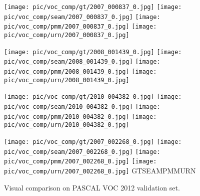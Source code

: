 \begin{figure}[h!]
\begin{centering}
\texttt{[image: pic/voc\_comp/gt/2007\_000837\_0.jpg]} \texttt{[image: pic/voc\_comp/seam/2007\_000837\_0.jpg]} \texttt{[image: pic/voc\_comp/pmm/2007\_000837\_0.jpg]} \texttt{[image: pic/voc\_comp/urn/2007\_000837\_0.jpg]}

\texttt{[image: pic/voc\_comp/gt/2008\_001439\_0.jpg]} \texttt{[image: pic/voc\_comp/seam/2008\_001439\_0.jpg]} \texttt{[image: pic/voc\_comp/pmm/2008\_001439\_0.jpg]} \texttt{[image: pic/voc\_comp/urn/2008\_001439\_0.jpg]}

\texttt{[image: pic/voc\_comp/gt/2010\_004382\_0.jpg]} \texttt{[image: pic/voc\_comp/seam/2010\_004382\_0.jpg]} \texttt{[image: pic/voc\_comp/pmm/2010\_004382\_0.jpg]} \texttt{[image: pic/voc\_comp/urn/2010\_004382\_0.jpg]}
  
\texttt{[image: pic/voc\_comp/gt/2007\_002268\_0.jpg]} \texttt{[image: pic/voc\_comp/seam/2007\_002268\_0.jpg]} \texttt{[image: pic/voc\_comp/pmm/2007\_002268\_0.jpg]} \texttt{[image: pic/voc\_comp/urn/2007\_002268\_0.jpg]}
\hspace*{0.25cm}GT\hspace*{1.2cm}SEAM\hspace*{1.2cm}PMM\hspace*{1.2cm}URN
\par\end{centering}
\begin{centering}
\caption{Visual comparison on PASCAL VOC 2012 validation set.}
\label{fig:voc_vis} 
\par\end{centering}
\centering{} 
\end{figure}

